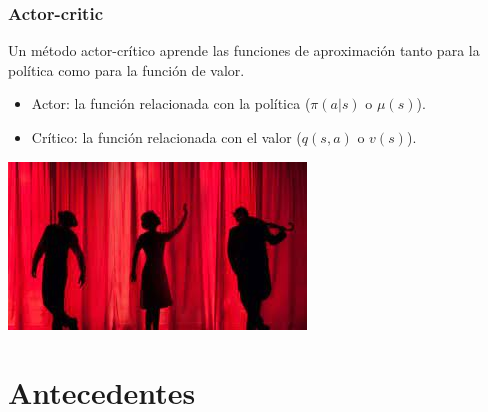 \documentclass[
    11pt,
    aspectratio=169,
]{beamer}
\begin{document}
\begin{frame}
\frametitle{Actor-critic}

Un método actor-crítico aprende las funciones de aproximación tanto para la política como para la función de valor.

\begin{itemize}
\item Actor: la función relacionada con la política ($\pi (a|s)$ o $\mu (s)$).
\item Crítico: la función relacionada con el valor ($q(s,a)$ o $v(s)$).
\end{itemize}

\begin{center}
\includegraphics[scale=0.4]{Images/actores}
\end{center}

\end{frame}

\section{Antecedentes}
\end{document}
